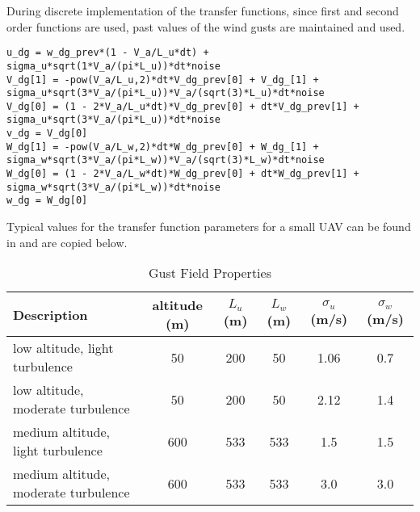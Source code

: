 During discrete implementation of the transfer functions, since first and second order functions are used, past values of the wind gusts are maintained and used.
\begin{lstlisting}[style=C-style]
u_dg = w_dg_prev*(1 - V_a/L_u*dt) + sigma_u*sqrt(1*V_a/(pi*L_u))*dt*noise
V_dg[1] = -pow(V_a/L_u,2)*dt*V_dg_prev[0] + V_dg_[1] + sigma_u*sqrt(3*V_a/(pi*L_u))*V_a/(sqrt(3)*L_u)*dt*noise
V_dg[0] = (1 - 2*V_a/L_u*dt)*V_dg_prev[0] + dt*V_dg_prev[1] + sigma_u*sqrt(3*V_a/(pi*L_u))*dt*noise
v_dg = V_dg[0]
W_dg[1] = -pow(V_a/L_w,2)*dt*W_dg_prev[0] + W_dg_[1] + sigma_w*sqrt(3*V_a/(pi*L_w))*V_a/(sqrt(3)*L_w)*dt*noise
W_dg[0] = (1 - 2*V_a/L_w*dt)*W_dg_prev[0] + dt*W_dg_prev[1] + sigma_w*sqrt(3*V_a/(pi*L_w))*dt*noise	
w_dg = W_dg[0]
\end{lstlisting}


Typical values for the transfer function parameters for a small UAV can be found in \cite{Langelaan2011} and are copied below.
\begin{table}[H]
	\centering
	\begin{tabular}{|p{5cm}|c|c|c|c|c|}
		\hline
		Description              & altitude (m) & $L_u$ (m) & $L_w$  (m) & $\sigma _u$ (m/s) & $\sigma _w$ (m/s) \\ \hline
		low altitude, light turbulence    &      50      &    200    &     50     &       1.06       &       0.7        \\ \hline
		low altitude, moderate turbulence   &      50      &    200    &     50     &       2.12       &       1.4        \\ \hline
		medium altitude, light turbulence   &     600      &    533    &    533     &       1.5        &       1.5        \\ \hline
		medium altitude, moderate turbulence &     600      &    533    &    533     &       3.0        &       3.0        \\ \hline
	\end{tabular} 
	\caption{Gust Field Properties}
\end{table}